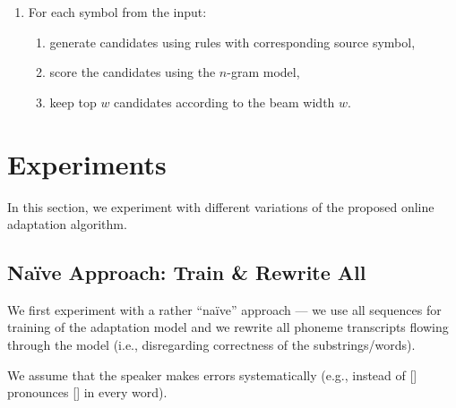 \begin{enumerate}
	\item For each symbol from the input:
		\begin{enumerate}
			\item generate candidates using rules with corresponding source symbol,
			\item score the candidates using the $n$-gram model,
			\item keep top $w$ candidates according to the beam width $w$. 
		\end{enumerate}
\end{enumerate}



\section{Experiments}
\label{oeasr:experiments}
In this section, we experiment with different variations of the proposed online adaptation algorithm.


\subsection{Na\"ive Approach: Train \& Rewrite All}
We first experiment with a rather ``na\"ive'' approach --- we use all sequences for training of the adaptation model and we rewrite all phoneme transcripts flowing through the model (i.e., disregarding correctness of the substrings/words).

We assume that the speaker makes errors systematically (e.g., instead of [] pronounces [] in every word).

